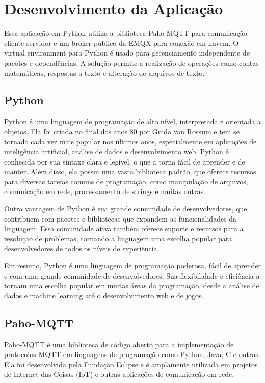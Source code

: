 \documentclass[12pt]{article}
\begin{document}
\section{Desenvolvimento da Aplicação}
Essa aplicação em Python utiliza a biblioteca Paho-MQTT para comunicação cliente-servidor e um broker público da EMQX para conexão em nuvem. O virtual environment para Python é usado para gerenciamento independente de pacotes e dependências. A solução permite a realização de operações como contas matemáticas, respostas a texto e alteração de arquivos de texto.

\subsection{Python}
Python é uma linguagem de programação de alto nível, interpretada e orientada a objetos. Ela foi criada no final dos anos 80 por Guido van Rossum e tem se tornado cada vez mais popular nos últimos anos, especialmente em aplicações de inteligência artificial, análise de dados e desenvolvimento web. Python é conhecida por sua sintaxe clara e legível, o que a torna fácil de aprender e de manter. Além disso, ela possui uma vasta biblioteca padrão, que oferece recursos para diversas tarefas comuns de programação, como manipulação de arquivos, comunicação em rede, processamento de strings e muitas outras.

Outra vantagem de Python é sua grande comunidade de desenvolvedores, que contribuem com pacotes e bibliotecas que expandem as funcionalidades da linguagem. Essa comunidade ativa também oferece suporte e recursos para a resolução de problemas, tornando a linguagem uma escolha popular para desenvolvedores de todos os níveis de experiência. 

Em resumo, Python é uma linguagem de programação poderosa, fácil de aprender e com uma grande comunidade de desenvolvedores. Sua flexibilidade e eficiência a tornam uma escolha popular em muitas áreas da programação, desde a análise de dados e machine learning até o desenvolvimento web e de jogos.

\subsection{Paho-MQTT}

Paho-MQTT é uma biblioteca de código aberto para a implementação de protocolos MQTT em linguagens de programação como Python, Java, C e outras. Ela foi desenvolvida pela Fundação Eclipse e é amplamente utilizada em projetos de Internet das Coisas (IoT) e outras aplicações de comunicação em rede.
\end{document}
